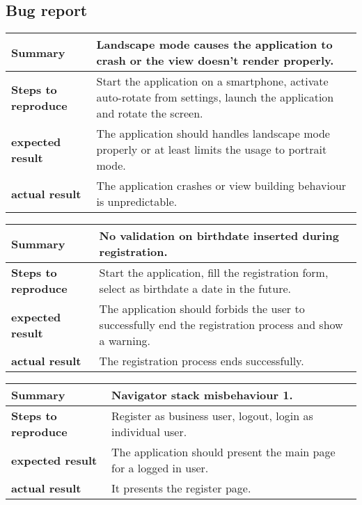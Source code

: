 \documentclass[../main.tex]{subfiles}
\begin{document}
    \subsection{Bug report}
    \begin{center}
		\begin{tabular}{p{3cm}p{8.28cm}}
			\hline
			\textbf{Summary} & Landscape mode causes the application to crash or the view doesn't render properly. \\
			\hline
			\textbf{Steps to reproduce} & Start the application on a smartphone, activate auto-rotate from settings, launch the application and rotate the screen.\\
			\hline
			\textbf{expected result} & The application should handles landscape mode properly or at least limits the usage to portrait mode.\\
			\hline
			\textbf{actual result} & The application crashes or view building behaviour is unpredictable.\\
		\end{tabular}
	\end{center}
    \vspace*{3cm}
    \begin{center}
		\begin{tabular}{p{3cm}p{8.28cm}}
			\hline
			\textbf{Summary} & No validation on birthdate inserted during registration. \\
			\hline
			\textbf{Steps to    reproduce} & Start the application, fill the registration form, select as birthdate a date in the future. \\
			\hline
			\textbf{expected result} & The application should forbids the user to successfully end the registration process and show a warning. \\
			\hline
			\textbf{actual result} & The registration process ends successfully.\\
		\end{tabular}
	\end{center}
    \vspace*{3cm}
    \begin{center}
		\begin{tabular}{p{3cm}p{8.28cm}}
			\hline
			\textbf{Summary} & Navigator stack misbehaviour 1. \\
			\hline
			\textbf{Steps to    reproduce} & Register as business user, logout, login as individual user. \\
			\hline
			\textbf{expected result} &  The application should present the main page for a logged in user. \\
			\hline
			\textbf{actual result} &  It presents the register page.\\
		\end{tabular}
	\end{center}
\end{document}
